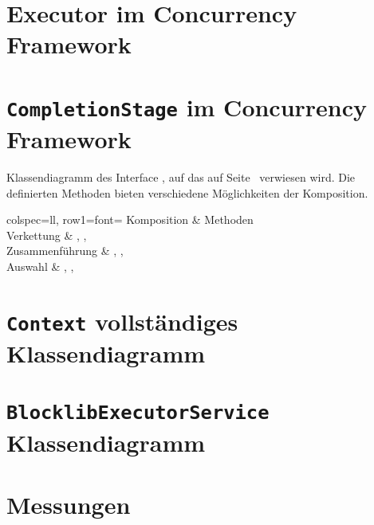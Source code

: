 \appendix
\clearpage
\renewcommand{\sectionmark}[1]{\markboth{\Ifnumbered{section}{Anhang \thesection}{}}{#1}}
\setcounter{page}{1}


\section{Executor im Concurrency Framework}\label{appendix:concFrameworkExecutor}


\section{\texttt{CompletionStage} im Concurrency Framework}\label{appendix:CompletionStage}

Klassendiagramm des Interface , auf das auf Seite~\pageref{sec:CompletableFuture} verwiesen wird. Die definierten Methoden bieten verschiedene Möglichkeiten der Komposition.

\begin{tblr}{
	colspec={ll},
	row{1}={font=\bfseries}
	}
	Komposition & Methoden \\
	Verkettung & , , \\
	Zusammenführung & , ,  \\
	Auswahl & , ,  \\
\end{tblr}

\pagebreak
\section{\texttt{Context} vollständiges Klassendiagramm}\label{appendix:context}
{
	\centering
	
}

\pagebreak
\section{\texttt{BlocklibExecutorService} Klassendiagramm}\label{appendix:BlocklibExecutorService}
{
	\centering
	
}
\pagebreak
\section{Messungen}
\pgfplotsset{
	height=3cm,
}
